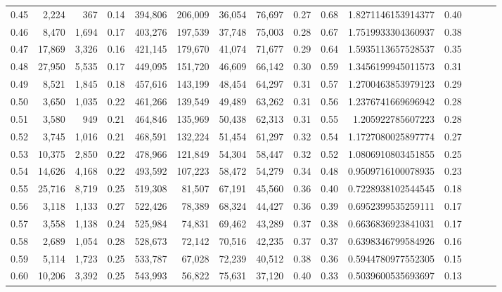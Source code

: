 \begin{tabular}{rrrrrrrrrrrrrrr}
0.45 &   2,224 &    367 &  0.14 &  394,806 &  206,009 &   36,054 &   76,697 &  0.27 &  0.68 &    1.8271146153914377 &      0.40 \\
0.46 &   8,470 &  1,694 &  0.17 &  403,276 &  197,539 &   37,748 &   75,003 &  0.28 &  0.67 &    1.7519933304360937 &      0.38 \\
0.47 &  17,869 &  3,326 &  0.16 &  421,145 &  179,670 &   41,074 &   71,677 &  0.29 &  0.64 &    1.5935113657528537 &      0.35 \\
0.48 &  27,950 &  5,535 &  0.17 &  449,095 &  151,720 &   46,609 &   66,142 &  0.30 &  0.59 &    1.3456199945011573 &      0.31 \\
0.49 &   8,521 &  1,845 &  0.18 &  457,616 &  143,199 &   48,454 &   64,297 &  0.31 &  0.57 &    1.2700463853979123 &      0.29 \\
0.50 &   3,650 &  1,035 &  0.22 &  461,266 &  139,549 &   49,489 &   63,262 &  0.31 &  0.56 &    1.2376741669696942 &      0.28 \\
0.51 &   3,580 &    949 &  0.21 &  464,846 &  135,969 &   50,438 &   62,313 &  0.31 &  0.55 &     1.205922785607223 &      0.28 \\
0.52 &   3,745 &  1,016 &  0.21 &  468,591 &  132,224 &   51,454 &   61,297 &  0.32 &  0.54 &    1.1727080025897774 &      0.27 \\
0.53 &  10,375 &  2,850 &  0.22 &  478,966 &  121,849 &   54,304 &   58,447 &  0.32 &  0.52 &    1.0806910803451855 &      0.25 \\
0.54 &  14,626 &  4,168 &  0.22 &  493,592 &  107,223 &   58,472 &   54,279 &  0.34 &  0.48 &    0.9509716100078935 &      0.23 \\
0.55 &  25,716 &  8,719 &  0.25 &  519,308 &   81,507 &   67,191 &   45,560 &  0.36 &  0.40 &    0.7228938102544545 &      0.18 \\
0.56 &   3,118 &  1,133 &  0.27 &  522,426 &   78,389 &   68,324 &   44,427 &  0.36 &  0.39 &    0.6952399535259111 &      0.17 \\
0.57 &   3,558 &  1,138 &  0.24 &  525,984 &   74,831 &   69,462 &   43,289 &  0.37 &  0.38 &    0.6636836923841031 &      0.17 \\
0.58 &   2,689 &  1,054 &  0.28 &  528,673 &   72,142 &   70,516 &   42,235 &  0.37 &  0.37 &    0.6398346799584926 &      0.16 \\
0.59 &   5,114 &  1,723 &  0.25 &  533,787 &   67,028 &   72,239 &   40,512 &  0.38 &  0.36 &    0.5944780977552305 &      0.15 \\
0.60 &  10,206 &  3,392 &  0.25 &  543,993 &   56,822 &   75,631 &   37,120 &  0.40 &  0.33 &    0.5039600535693697 &      0.13 \\

\end{tabular}
